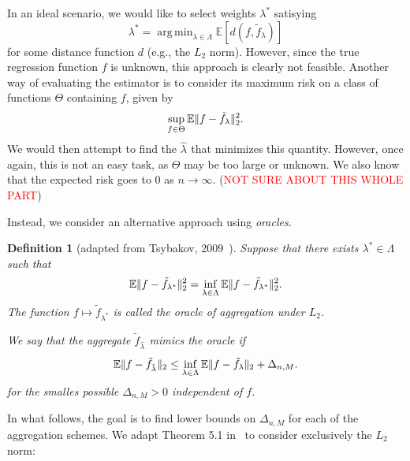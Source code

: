 \documentclass[12pt, letter paper]{article}
\newcommand{\1}{\mathmybb{1}}
\newtheorem{definition}{Definition}[section]
\DeclareMathOperator*{\argmin}{arg\,min}
\newcommand{\0}{\emptyset}
\newcommand{\E}{\mathbb{E}}
\newcommand{\Ep}[1]{\mathbb{E}\left[ #1 \right]}
\newcommand{\paren}[1]{\left(#1 \right)}
\newcommand{\norm}[1]{|\hspace{-1pt}|#1 |\hspace{-1pt}|}
\newcommand{\normsq}[1]{\norm{#1}^{2}}
\newcommand{\ftilde}[1]{\tilde{f}_{#1}}
\newcommand{\lambdahat}[1]{\hat{\lambda}_{#1}}
\begin{document}
In an ideal scenario, we would like to select  weights \(\lambda^*\) satisying 
\[\lambda^{*} = \argmin_{\lambda\in\Lambda}\Ep{d\paren{f, \ftilde{\lambda}}}\]
for some distance function \(d\) (e.g., the \(L_{2}\) norm). However, since the true regression function \(f\) is unknown, this approach is clearly not feasible. Another way of evaluating the estimator is to consider its maximum risk on a class of functions \(\Theta\) containing \(f\), given by 
\[\sup_{f\in\Theta}\E\normsq{f-\ftilde{\lambda}}_{2}.\]
We would then attempt to find the \(\lambdahat{}\) that minimizes this quantity. However, once again, this is not an easy task, as \(\Theta\) may be too large or unknown. We also know that the expected risk goes to 0 as \(n\to \infty\).
(\textcolor{red}{NOT SURE ABOUT THIS WHOLE PART})

Instead, we consider an alternative approach using \emph{oracles.} 

\begin{definition}[adapted from Tsybakov, 2009~\cite{tsybakov_introduction_2009}]
    Suppose that there exists \(\lambda^{*}\in\Lambda\) such that 
    \[\E\normsq{f-\ftilde{\lambda^{*}}}_{2} = \inf_{\lambda\in\Lambda}\E\normsq{f-\ftilde{\lambda^{*}}}_{2}.\]
    The function \(f\mapsto \ftilde{\lambda^{*}}\) is called the oracle of aggregation under \(L_{2}\).

    We say that the aggregate \(\ftilde{\lambdahat{}}\) \emph{mimics} the oracle if
    \begin{equation}\label{eq:oracleineq}
        \E\norm{f - \ftilde{\lambdahat{}}}_{2} \leq \inf_{\lambda\in\Lambda}\E\norm{f - \ftilde{\lambda}}_{2} + \Delta_{n,M}.
    \end{equation}
    for the smalles possible \(\Delta_{n,M}>0\) independent of \(f\).
\end{definition}

In what follows, the goal is to find lower bounds on \(\Delta_{n,M}\) for each of the aggregation schemes. We adapt Theorem 5.1 in~\cite{bunea_2007} to consider exclusively the \(L_{2}\) norm:
\end{document}
